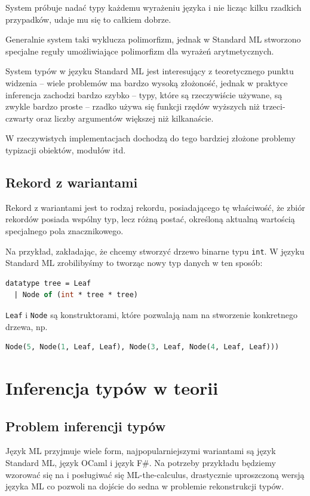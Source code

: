 \documentclass[a4paper,12pt]{book} %
\begin{document}
System próbuje nadać typy każdemu wyrażeniu języka i nie licząc kilku rzadkich przypadków, udaje mu się to całkiem dobrze.

Generalnie system taki wyklucza polimorfizm, jednak w Standard ML stworzono specjalne reguły umożliwiające polimorfizm dla wyrażeń arytmetycznych.

System typów w języku Standard ML jest interesujący z teoretycznego punktu widzenia – wiele problemów ma bardzo wysoką złożoność, jednak w praktyce inferencja zachodzi bardzo szybko – typy, które są rzeczywiście używane, są zwykle bardzo proste – rzadko używa się funkcji rzędów wyższych niż trzeci-czwarty oraz liczby argumentów większej niż kilkanaście.

W rzeczywistych implementacjach dochodzą do tego bardziej złożone problemy typizacji obiektów, modułów itd.

\section{Rekord z wariantami} Rekord z wariantami jest to rodzaj rekordu, posiadającego tę właściwość, że zbiór rekordów posiada wspólny typ, lecz różną postać, określoną aktualną wartością specjalnego pola znacznikowego.

Na przykład, zakładając, że chcemy stworzyć drzewo binarne typu \lstinline$int$. W języku Standard ML zrobilibyśmy to tworząc nowy typ danych w ten sposób:
\begin{lstlisting}[language=ML]
datatype tree = Leaf
  | Node of (int * tree * tree)
\end{lstlisting}
\lstinline{Leaf} i \lstinline{Node} są konstruktorami, które pozwalają nam na stworzenie konkretnego drzewa, np.
\begin{lstlisting}[language=ML]
  Node(5, Node(1, Leaf, Leaf), Node(3, Leaf, Node(4, Leaf, Leaf)))
\end{lstlisting}
\chapter{Inferencja typów w teorii}
\section{Problem inferencji typów}
Język ML przyjmuje wiele form, najpopularniejszymi wariantami są język Standard ML, język OCaml
i język F\#. Na potrzeby przykładu będziemy wzorować się na \cite{Damas__Milner__1982} i posługiwać się ML-the-calculus, drastycznie uproszczoną wersją języka ML co pozwoli na dojście do sedna w problemie rekonstrukcji typów.
\end{document}
